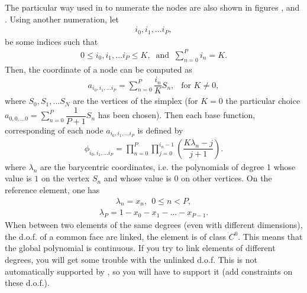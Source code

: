 \documentclass[a4paper,11pt,english]{sphinxmanual}
\begin{document}
The particular way used in  to numerate the nodes are also shown in figures
{\hyperref[\detokenize{userdoc/appendixA:ud-fig-segmentpk}]{}}, {\hyperref[\detokenize{userdoc/appendixA:ud-fig-trianglepk}]{}} and
{\hyperref[\detokenize{userdoc/appendixA:ud-fig-tetrahedronpk}]{}}. Using another numeration, let
\begin{equation*}
\begin{split}i_0, i_1, ... i_P,\end{split}
\end{equation*}
be some indices such that
\begin{equation*}
\begin{split}0 \leq i_0, i_1, ... i_P \leq K, \ \mbox{ and } \ \sum_{n = 0}^{P} i_n = K.\end{split}
\end{equation*}
Then, the coordinate of a node can be computed as
\begin{equation*}
\begin{split}a_{i_0, i_1, ... i_P} = \sum_{n = 0}^{P} \dfrac{i_n}{K}S_n, \ \ \mbox{ for } K \neq 0,\end{split}
\end{equation*}
where \(S_0, S_1, ... S_N\) are the vertices of the simplex (for \(K = 0\)
the particular choice \(a_{0, 0, ... 0} =  \sum_{n = 0}^{P}
\dfrac{1}{P+1}S_n\) has been chosen). Then each base function, corresponding of each
node \(a_{i_0, i_1, ... i_P}\) is defined by
\begin{equation*}
\begin{split}\phi_{i_0, i_1, ... i_P} = \prod_{n = 0}^{P} \prod_{j=0}^{i_n-1} \left(\dfrac{K \lambda_n - j}{j+1}\right).\end{split}
\end{equation*}
where \(\lambda_n\) are the barycentric coordinates, i.e. the polynomials of
degree 1 whose value is \(1\) on the vertex \(S_n\) and whose value is
\(0\) on other vertices. On the reference element, one has
\begin{equation*}
\begin{split}\lambda_n = x_n, \ \ 0 \leq n < P,\end{split}
\end{equation*}\begin{equation*}
\begin{split}\lambda_P = 1 - x_0 - x_1 - ... - x_{P-1}.\end{split}
\end{equation*}
When between two elements of the same degrees (even with different dimensions),
the d.o.f. of a common face are linked, the element is of class \(C^0\). This
means that the global polynomial is continuous. If you try to link elements of
different degrees, you will get some trouble with the unlinked d.o.f. This is not
automatically supported by , so you will have to support it (add constraints
on these d.o.f.).
\end{document}
